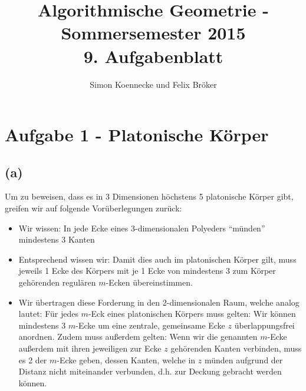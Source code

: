 \documentclass[a4paper]{article}
\begin{document}
\title{Algorithmische Geometrie - Sommersemester 2015\\
       9. Aufgabenblatt }
\author{Simon Koennecke und Felix Bröker}
\date{}
\maketitle

\section*{Aufgabe 1 - Platonische Körper}
\subsection*{(a)}
Um zu beweisen, dass es in 3 Dimensionen höchstens 5 platonische Körper gibt, 
greifen wir auf folgende Vorüberlegungen zurück:

\begin{itemize}
	\item Wir wissen: In jede Ecke eines 3-dimensionalen Polyeders "`münden"' mindestens 3 Kanten
	\item Entsprechend wissen wir: Damit dies auch im platonischen Körper gilt, muss jeweils 1 Ecke des Körpers
	mit je 1 Ecke von mindestens 3 zum Körper gehörenden regulären $m$-Ecken übereinstimmen. 
	\item Wir übertragen diese Forderung in den 2-dimensionalen Raum, welche analog lautet:
	Für jedes $m$-Eck eines platonischen Körpers muss gelten: Wir können mindestens 
	3 $m$-Ecke um eine zentrale, gemeinsame Ecke $z$ überlappungsfrei anordnen. Zudem muss außerdem gelten:
	Wenn wir die genannten $m$-Ecke außerdem mit ihren jeweiligen zur Ecke $z$ gehörenden Kanten
	verbinden, muss es 2 der $m$-Ecke geben, dessen Kanten, welche in $z$ münden 
	aufgrund der Distanz nicht miteinander verbunden, d.h. zur Deckung gebracht werden können.	
\end{itemize}

	\begin{figure}[!htb]
	\end{figure} 
\end{document}
